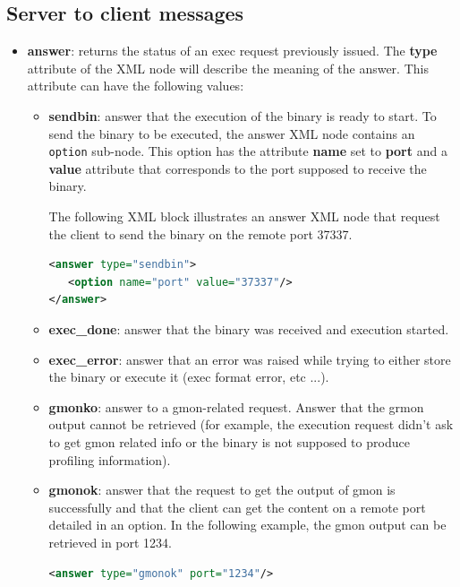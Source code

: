 \documentclass[11pt]{book}
\begin{document}
      \subsection{Server to client messages}
      \begin{itemize}
         \item
            \textbf{answer}: returns the status of an exec request previously
            issued. The \textbf{type} attribute of the XML node will describe
            the meaning of the answer. This attribute can have the following
            values:
            \begin{itemize}
               \item
                  \textbf{sendbin}: answer that the execution of the binary is
                  ready to start. To send the binary to be executed, the answer
                  XML node contains an \texttt{option} sub-node. This option has
                  the attribute \textbf{name} set to \textbf{port} and a
                  \textbf{value} attribute that corresponds to the port supposed to receive the binary.

                  The following XML block illustrates an answer XML node that
                  request the client to send the binary on the remote port
                  37337.
      \begin{lstlisting}[language=xml]
<answer type="sendbin">
   <option name="port" value="37337"/>
</answer>
      \end{lstlisting}
                  
               \item
                  \textbf{exec\_done}: answer that the binary was received and
                  execution started.
               \item
                  \textbf{exec\_error}: answer that an error was raised while
                  trying to either store the binary or execute it (exec format
                  error, etc ...).
               \item
                  \textbf{gmonko}: answer to a gmon-related request. Answer that
                  the grmon output cannot be retrieved (for example, the
                  execution request didn't ask to get gmon related info or the
                  binary is not supposed to produce profiling information).
               \item
                  \textbf{gmonok}: answer that the request to get the output of
                  gmon is successfully and that the client can get the content
                  on a remote port detailed in an option. In the following
                  example, the gmon output can be retrieved in port 1234.
      \begin{lstlisting}[language=xml]
<answer type="gmonok" port="1234"/>
      \end{lstlisting}


\end{itemize}
\end{itemize}
\end{document}
